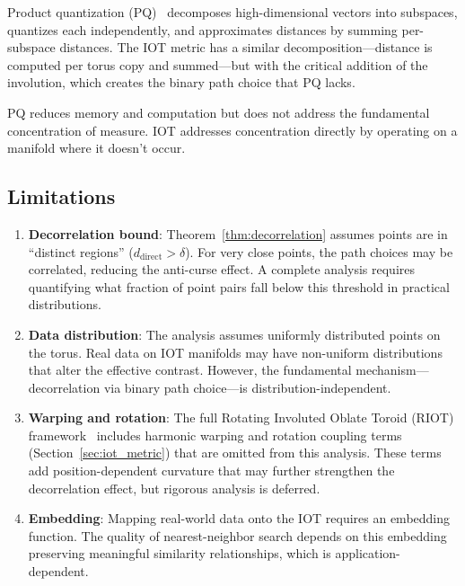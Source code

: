 Product quantization (PQ)~\cite{jegou2011product} decomposes high-dimensional vectors into subspaces, quantizes each independently, and approximates distances by summing per-subspace distances. The IOT metric has a similar decomposition---distance is computed per torus copy and summed---but with the critical addition of the involution, which creates the binary path choice that PQ lacks.

PQ reduces memory and computation but does not address the fundamental concentration of measure. IOT addresses concentration directly by operating on a manifold where it doesn't occur.

\subsection{Limitations}

\begin{enumerate}
    \item \textbf{Decorrelation bound}: Theorem~\ref{thm:decorrelation} assumes points are in ``distinct regions'' ($d_{\text{direct}} > \delta$). For very close points, the path choices may be correlated, reducing the anti-curse effect. A complete analysis requires quantifying what fraction of point pairs fall below this threshold in practical distributions.

    \item \textbf{Data distribution}: The analysis assumes uniformly distributed points on the torus. Real data on IOT manifolds may have non-uniform distributions that alter the effective contrast. However, the fundamental mechanism---decorrelation via binary path choice---is distribution-independent.

    \item \textbf{Warping and rotation}: The full Rotating Involuted Oblate Toroid (RIOT) framework~\cite{gaddr2025ppf} includes harmonic warping and rotation coupling terms (Section~\ref{sec:iot_metric}) that are omitted from this analysis. These terms add position-dependent curvature that may further strengthen the decorrelation effect, but rigorous analysis is deferred.

    \item \textbf{Embedding}: Mapping real-world data onto the IOT requires an embedding function. The quality of nearest-neighbor search depends on this embedding preserving meaningful similarity relationships, which is application-dependent.
\end{enumerate}

